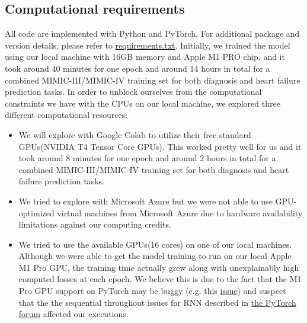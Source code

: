 \documentclass[11pt,a4paper,fleqn]{article}
\begin{document}
\subsection{Computational requirements}
All code are implemented with Python and PyTorch. For additional package and
version details, please refer to
\href{https://github.com/willtsai/dlh-sp23-team53/blob/main/requirements.txt}{requirements.txt}.
Initially, we trained the model using our local machine with 16GB memory
and Apple M1 PRO chip, and it took around 40 minutes for one epoch and around 14 hours in total 
for a combined MIMIC-III/MIMIC-IV training set for both diagnosis and heart failure prediction
tasks. In order to unblock ourselves from the computational constraints we have with the CPUs on
our local machine, we explored three different computational resources:
\begin{itemize}
  \item We will explore with Google Colab to utilize their free standard 
  GPUs(NVIDIA T4 Tensor Core GPUs). This worked pretty well for us and it took around 8 minutes for one epoch and around 2 hours in total 
  for a combined MIMIC-III/MIMIC-IV training set for both diagnosis and heart failure prediction
  tasks.
  \item We tried to explore with Microsoft Azure but we were not able to use GPU-optimized virtual machines from Microsoft Azure due
  to hardware availability limitations against our computing credits.
  \item We tried to use the available GPUs(16 cores) on one of our local
  machines. Although we were able to get the model training to run on our local Apple M1 Pro
  GPU, the training time actually grew along with unexplainably high computed
  losses at each epoch. We believe this is due to the fact that the M1 Pro GPU
  support on PyTorch may be buggy (e.g. this
  \hyperlink{https://github.com/pytorch/pytorch/issues/77799}{issue}) and suspect
  that the the sequential throughout issues for RNN described in
  \hyperlink{https://discuss.pytorch.org/t/sequential-throughput-of-gpu-execution/156303}{the
  PyTorch forum} \cite{pytorch_forum} affected our executions.
\end{itemize}
\end{document}
